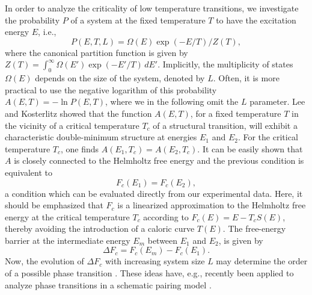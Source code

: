 \begin{multicols}{2}
In order to analyze the criticality of low temperature transitions, we 
investigate the probability $P$ of a system at the fixed temperature $T$ to 
have the excitation energy $E$, i.e.,
\begin{equation}
P(E,T,L)=\Omega(E)\exp\left(-E/T\right)/Z(T),
\end{equation}
where the canonical partition function is given by 
$Z(T)=\int_0^\infty\Omega(E')\exp\left(-E'/T\right)\,dE'$. Implicitly, the 
multiplicity of states $\Omega(E)$ depends on the size of the system, denoted 
by $L$. Often, it is more practical to use the negative logarithm of this 
probability $A(E,T)=-\ln P(E,T)$, where we in the following omit the $L$ 
parameter. Lee and Kosterlitz showed \cite{LK90,LK91} that the function 
$A(E,T)$, for a fixed temperature $T$ in the vicinity of a critical temperature
$T_c$ of a structural transition, will exhibit a characteristic double-minimum 
structure at energies $E_1$ and $E_2$. For the critical temperature $T_c$, one 
finds $A(E_1,T_c)=A(E_2,T_c)$. It can be easily shown that $A$ is closely 
connected to the Helmholtz free energy and the previous condition is equivalent
to
\begin{equation}
F_c(E_1)=F_c(E_2),
\end{equation}
a condition which can be evaluated directly from our experimental data. Here, 
it should be emphasized that $F_c$ is a linearized approximation to the 
Helmholtz free energy at the critical temperature $T_c$ according to 
$F_c(E)=E-T_cS(E)$, thereby avoiding the introduction of a caloric curve 
$T(E)$. The free-energy barrier at the intermediate energy $E_m$ between $E_1$ 
and $E_2$, is given by
\begin{equation}
\Delta F_c=F_c(E_m)-F_c(E_1).
\end{equation}
Now, the evolution of $\Delta F_c$ with increasing system size $L$ may 
determine the order of a possible phase transition \cite{LK90,LK91}. These 
ideas have, e.g., recently been applied to analyze phase transitions in a 
schematic pairing model \cite{BD01}.


\end{multicols}
